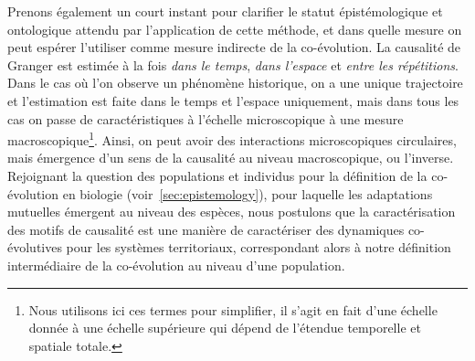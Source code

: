 {Prenons également un court instant pour clarifier le statut épistémologique et ontologique attendu par l'application de cette méthode, et dans quelle mesure on peut espérer l'utiliser comme mesure indirecte de la co-évolution. La causalité de Granger est estimée à la fois \emph{dans le temps}, \emph{dans l'espace} et \emph{entre les répétitions}. Dans le cas où l'on observe un phénomène historique, on a une unique trajectoire et l'estimation est faite dans le temps et l'espace uniquement, mais dans tous les cas on passe de caractéristiques à l'échelle microscopique à une mesure macroscopique\footnote{Nous utilisons ici ces termes pour simplifier, il s'agit en fait d'une échelle donnée à une échelle supérieure qui dépend de l'étendue temporelle et spatiale totale.}. Ainsi, on peut avoir des interactions microscopiques circulaires, mais émergence d'un sens de la causalité au niveau macroscopique, ou l'inverse. Rejoignant la question des populations et individus pour la définition de la co-évolution en biologie (voir~\ref{sec:epistemology}), pour laquelle les adaptations mutuelles émergent au niveau des espèces, nous postulons que la caractérisation des motifs de causalité est une manière de caractériser des dynamiques co-évolutives pour les systèmes territoriaux, correspondant alors à notre définition intermédiaire de la co-évolution au niveau d'une population.
}



